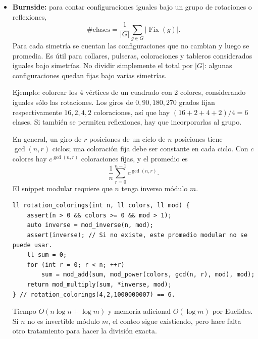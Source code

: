 \begin{itemize}
\begin{lstlisting}[style=cpp]
vector<ll> derangements(int n, ll mod) {
    assert(n >= 0 && mod > 0);
    vector<ll> d(n + 1);
    d[0] = 1 % mod;
    for (int i = 2; i <= n; ++i)
        d[i] = mod_multiply(i-1, mod_add(d[i-1], d[i-2], mod), mod);
    return d; // derangements(4,1000000007)[4] == 9.
}
\end{lstlisting}

  Tiempo y memoria $O(n)$; admite m\'odulo compuesto. Si s\'olo se necesita
  $D_n$, conservar los dos valores anteriores reduce memoria a $O(1)$.
  \item \textbf{Burnside:} para contar configuraciones iguales bajo un grupo de
  rotaciones o reflexiones,
  \[
      \#\text{clases}=\frac1{|G|}\sum_{g\in G}|\operatorname{Fix}(g)|.
  \]
  Para cada simetr\'ia se cuentan las configuraciones que no cambian y luego se
  promedia. Es \'util para collares, pulseras, coloraciones y tableros considerados
  iguales bajo simetr\'ias. No dividir simplemente el total por $|G|$: algunas
  configuraciones quedan fijas bajo varias simetr\'ias.

  Ejemplo: colorear los 4 v\'ertices de un cuadrado con 2 colores, considerando
  iguales s\'olo las rotaciones. Los giros de $0,90,180,270$ grados fijan
  respectivamente $16,2,4,2$ coloraciones, as\'i que hay
  $(16+2+4+2)/4=6$ clases. Si tambi\'en se permiten reflexiones, hay que
  incorporarlas al grupo.

  En general, un giro de $r$ posiciones de un ciclo de $n$ posiciones tiene
  $\gcd(n,r)$ ciclos; una coloraci\'on fija debe ser constante en cada ciclo.
  Con $c$ colores hay $c^{\gcd(n,r)}$ coloraciones fijas, y el promedio es
  \[
      \frac1n\sum_{r=0}^{n-1}c^{\gcd(n,r)}.
  \]
  El snippet modular requiere que $n$ tenga inverso m\'odulo $m$.

\begin{lstlisting}[style=cpp]
ll rotation_colorings(int n, ll colors, ll mod) {
    assert(n > 0 && colors >= 0 && mod > 1);
    auto inverse = mod_inverse(n, mod);
    assert(inverse); // Si no existe, este promedio modular no se puede usar.
    ll sum = 0;
    for (int r = 0; r < n; ++r)
        sum = mod_add(sum, mod_power(colors, gcd(n, r), mod), mod);
    return mod_multiply(sum, *inverse, mod);
} // rotation_colorings(4,2,1000000007) == 6.
\end{lstlisting}

  Tiempo $O(n\log n+\log m)$ y memoria adicional $O(\log m)$ por Euclides.
  Si $n$ no es invertible m\'odulo $m$, el conteo sigue existiendo, pero
  hace falta otro tratamiento para hacer la divisi\'on exacta.
\end{itemize}

